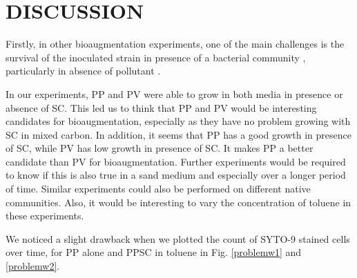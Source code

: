\documentclass[a4paper, 10pt, conference]{ieeeconf}   %
\begin{document}
\section{DISCUSSION}


%	 
%	  

Firstly, in other bioaugmentation experiments, one of the main challenges is the survival of the inoculated strain in presence of a bacterial community \cite{bouchez} \cite{oldarticle}, particularly in absence of pollutant \cite{nodrawback}.

In our experiments, PP and PV were able to grow in both media in presence or absence of SC. This led us to think that PP and PV would be interesting candidates for bioaugmentation, especially as they have no problem growing with SC in mixed carbon. In addition, it seems that PP has a good growth in presence of SC, while PV has low growth in presence of SC. It makes PP a better candidate than PV for bioaugmentation.
Further experiments would be required to know if this is also true in a sand medium and especially over a longer period of time. Similar experiments could also be performed on different native communities. Also, it would be interesting to vary the concentration of toluene in these experiments. 

We noticed a slight drawback when we plotted the count of SYTO-9 stained cells over time, for PP alone and PPSC in toluene in Fig. \ref{problemw1} and \ref{problemw2}. 
\end{document}
